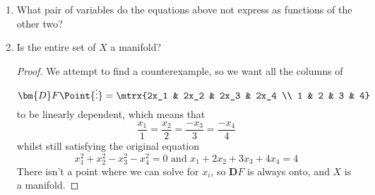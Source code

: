 \begin{enumerate}
\item What pair of variables do the equations above not express as functions of the other two? 

\item Is the entire set of $X$ a manifold? 

\begin{proof}
We attempt to find a counterexample, so we want all the columns of 
\[\bm{D}F\Point{\vdots} = \mtrx{2x_1 & 2x_2 & 2x_3 & 2x_4 \\ 1 & 2 & 3 & 4}\]
to be linearly dependent, which means that
\[\frac{x_1}{1}=\frac{x_2}{2}=\frac{-x_3}{3} = \frac{-x_4}{4}\]
whilst still satisfying the original equation
\[x_1^2+x_2^2-x_3^2-x_4^2=0\text{ and }x_1+2x_2+3x_3+4x_4=4\]
There isn't a point where we can solve for $x_i$, so $\bm{D}F$ is always onto, and $X$ is a manifold. 
\end{proof}

\end{enumerate}